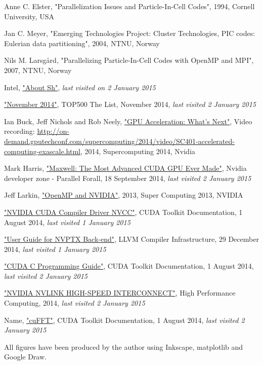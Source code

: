 \documentclass[a4paper]{report}
\begin{document}
\begin{thebibliography}{13}
		Anne C. Elster,
		"Parallelization Issues and Particle-In-Cell Codes",
		1994,
		Cornell University,
		USA
		
		Jan C. Meyer,
		"Emerging Technologies Project: Cluster Technologies, PIC codes: Eulerian data partitioning",
		2004,
		NTNU,
		Norway
	
		Nils M. Larsgård,
		"Parallelizing Particle-In-Cell Codes with OpenMP and MPI",
		2007,
		NTNU,
		Norway
	
		Intel,
		\href{http://libsh.org/about.html}{"About Sh"},
		\emph{last visited on 2 January 2015}
	
		\href{http://www.top500.org/lists/2014/11/}{"November 2014"},
		TOP500 The List,
		November 2014,
		\emph{last visited 2 January 2015}
	
		Ian Buck, Jeff Nichols and Rob Neely,
		\href{http://on-demand.gputechconf.com/supercomputing/2014/presentation/SC401-accelerated-computing-exascale.pdf}{"GPU Acceleration: What's Next"},
		Video recording: \url{http://on-demand.gputechconf.com/supercomputing/2014/video/SC401-accelerated-computing-exascale.html},
		2014,
		Supercomputing 2014,
		Nvidia
	
		Mark Harris,
		\href{http://devblogs.nvidia.com/parallelforall/maxwell-most-advanced-cuda-gpu-ever-made/}{"Maxwell: The Most Advanced CUDA GPU Ever Made"},
		Nvidia developer zone - Parallel Forall,
		18 September 2014,
		\emph{last visited 2 January 2015}
	
		Jeff Larkin,
		\href{http://openmp.org/sc13/SC13_OpenMP_and_NVIDIA.pdf}{"OpenMP and NVIDIA"},
		2013,
		Super Computing 2013,
		NVIDIA
	
		\href{http://docs.nvidia.com/cuda/cuda-compiler-driver-nvcc/}{"NVIDIA CUDA Compiler Driver NVCC"},
		CUDA Toolkit Documentation,
		1 August 2014,
		\emph{last visited 1 January 2015}
	
		\href{http://llvm.org/docs/NVPTXUsage.html}{"User Guide for NVPTX Back-end"},
		LLVM Compiler Infrastructure,
		29 December 2014,
		\emph{last visited 1 January 2015}
	
		\href{http://docs.nvidia.com/cuda/cuda-c-programming-guide/}{"CUDA C Programming Guide"},
		CUDA Toolkit Documentation,
		1 August 2014,
		\emph{last visited 2 January 2015}
	
		\href{http://www.nvidia.com/object/nvlink.html}{"NVIDIA NVLINK HIGH-SPEED INTERCONNECT"},
		High Performance Computing,
		2014,
		\emph{last visited 2 January 2015}
	
		Name,
		\href{http://docs.nvidia.com/cuda/cufft/}{"cuFFT"},
		CUDA Toolkit Documentation,
		1 August 2014,
		\emph{last visited 2 January 2015}

\end{thebibliography}
All figures have been produced by the author using Inkscape, matplotlib and Google Draw.
\end{document}

